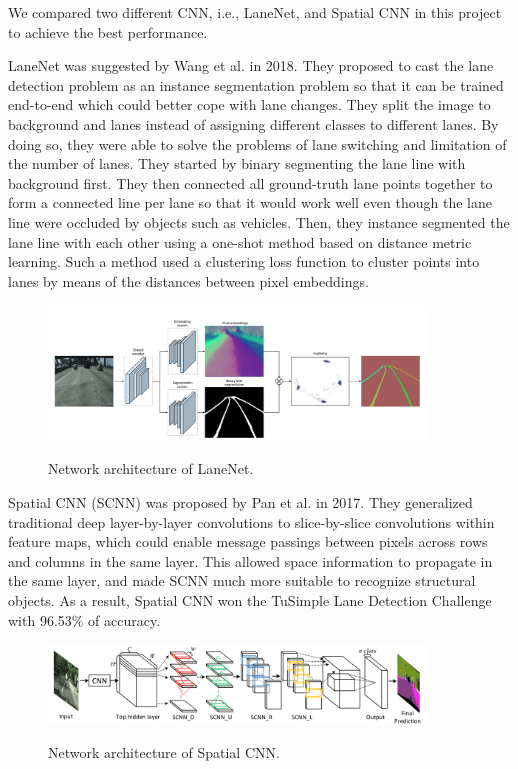 \documentclass[runningheads]{llncs}
\begin{document}
We compared two different CNN, i.e., LaneNet, and Spatial 
CNN in this project to achieve the best performance. 

LaneNet was suggested by Wang et al.\cite{LaneNet} in 2018. 
They proposed to cast the lane detection problem as an 
instance segmentation problem so that it can be trained 
end-to-end which could better cope with lane changes. 
They split the image to background and lanes instead of 
assigning different classes to different lanes. By doing so, 
they were able to solve the problems of lane switching and 
limitation of the number of lanes. They started by binary 
segmenting the lane line with background first. They then
connected all ground-truth lane points together to form a 
connected line per lane so that it would work well even 
though the lane line were occluded by objects such as 
vehicles. Then, they instance segmented the lane line with 
each other using a one-shot method based on distance metric 
learning. Such a method used a clustering loss function to 
cluster points into lanes by means of the distances between 
pixel embeddings.

 
\begin{figure}
    \centering
    \includegraphics[width=10cm]{reference/lanenet}
    \label{fig:LaneNet}
    \caption{Network architecture of LaneNet.\cite{LaneNet}}
\end{figure}

Spatial CNN (SCNN) was proposed by Pan et al.
\cite{SpatialCNN} in 2017. They generalized traditional 
deep layer-by-layer convolutions to slice-by-slice 
convolutions within feature maps, which could enable 
message passings between pixels across rows and columns in 
the same layer. This allowed space information to propagate 
in the same layer, and made SCNN much more suitable to 
recognize structural objects. As a result, Spatial CNN won 
the TuSimple Lane Detection Challenge with 96.53\% of 
accuracy. 

\begin{figure}
    \centering
    \includegraphics[width=10cm]{reference/scnn}
    \label{fig:SCNN}
    \caption{Network architecture of Spatial CNN.\cite{SpatialCNN}}
\end{figure}
\end{document}
